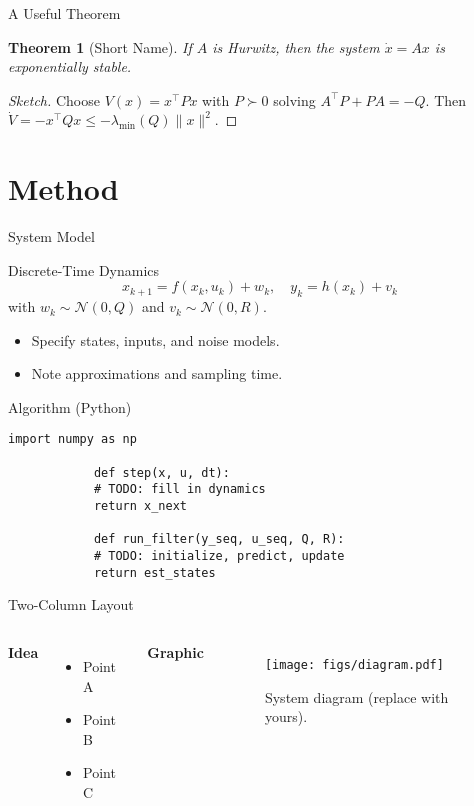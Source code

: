\documentclass[10pt,aspectratio=169]{beamer}
\theoremstyle{definition}
\theoremstyle{plain}
\newtheorem{theorem}{Theorem}
\theoremstyle{remark}
\begin{document}
	\begin{frame}{A Useful Theorem}
		\begin{theorem}[Short Name]
			If $A$ is Hurwitz, then the system $\dot{x}=Ax$ is exponentially stable.
		\end{theorem}
		\begin{proof}[Sketch]
			Choose $V(x)=x^\top Px$ with $P\succ0$ solving $A^\top P+PA=-Q$. Then $\dot{V}=-x^\top Q x\le -\lambda_{\min}(Q)\|x\|^2$.
		\end{proof}
	\end{frame}
	
	\section{Method}
	
	\begin{frame}{System Model}
		\begin{block}{Discrete-Time Dynamics}
			\[
			x_{k+1} = f(x_k,u_k) + w_k,\quad y_k = h(x_k) + v_k
			\]
			with $w_k\sim\mathcal{N}(0,Q)$ and $v_k\sim\mathcal{N}(0,R)$.
			\]
		\end{block}
		\begin{itemize}
			\item Specify states, inputs, and noise models.
			\item Note approximations and sampling time.
		\end{itemize}
	\end{frame}
	
	\begin{frame}[fragile]{Algorithm (Python)}
		\begin{lstlisting}[style=py,caption={Pseudocode/Reference Implementation}]
			import numpy as np
			
			def step(x, u, dt):
			# TODO: fill in dynamics
			return x_next
			
			def run_filter(y_seq, u_seq, Q, R):
			# TODO: initialize, predict, update
			return est_states
		\end{lstlisting}
	\end{frame}
	
	\begin{frame}{Two-Column Layout}
		\begin{columns}[T,onlytextwidth]
			\textbf{Idea}
			\begin{itemize}
				\item Point A
				\item Point B
				\item Point C
			\end{itemize}
			
			\textbf{Graphic}
			\begin{figure}
				\texttt{[image: figs/diagram.pdf]}
				\caption{System diagram (replace with yours).}
			\end{figure}
		\end{columns}
	\end{frame}
	
\end{document}
